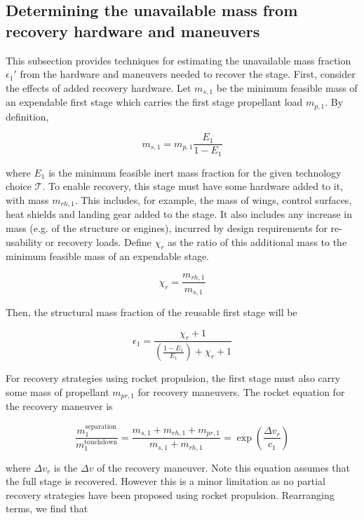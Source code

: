 \documentclass[conf]{new-aiaa}
\begin{document}
\subsection{Determining the unavailable mass from recovery hardware and maneuvers}
This subsection provides techniques for estimating the unavailable mass fraction $\epsilon_1'$ from the hardware and maneuvers needed to recover the stage. First, consider the effects of added recovery hardware. Let $m_{s,1}$ be the minimum feasible mass of an expendable first stage which carries the first stage propellant load $m_{p,1}$. By definition,

\begin{equation}
m_{s,1} = m_{p,1} \frac{E_1}{1 - E_1}
\end{equation}

where $E_1$ is the minimum feasible inert mass fraction for the given technology choice $\mathcal{T}$. To enable recovery, this stage must have some hardware added to it, with mass $m_{rh,1}$. This includes, for example, the mass of wings, control surfaces, heat shields and landing gear added to the stage. It also includes any increase in mass (e.g. of the structure or engines), incurred by design requirements for re-usability or recovery loads. Define $\chi_r$ as the ratio of this additional mass to the minimum feasible mass of an expendable stage.

\begin{equation}
\chi_r = \frac{m_{rh,1}}{m_{s,1}}
\end{equation}

Then, the structural mass fraction of the reusable first stage will be

\begin{equation}
\epsilon_1 = \frac{\chi_r + 1}{\left(\frac{1 - E_1}{E_1} \right) + \chi_r + 1}
\end{equation}

For recovery strategies using rocket propulsion, the first stage must also carry some mass of propellant $m_{pr,1}$ for recovery maneuvers. The rocket equation for the recovery maneuver is

\begin{equation}
\label{eq:recov_rocket_eqn}
\frac{m_1^{\mathrm{separation}}}{m_1^{\mathrm{touchdown}}} = \frac{m_{s,1} + m_{rh,1} + m_{pr,1}}{m_{s,1} + m_{rh,1}} = \exp\left( \frac{\Delta v_r}{c_1} \right)
\end{equation}

where $\Delta v_r$ is the $\Delta v$ of the recovery maneuver. Note this equation assumes that the full stage is recovered. However this is a minor limitation as no partial recovery strategies have been proposed using rocket propulsion. Rearranging terms, we find that
\end{document}
